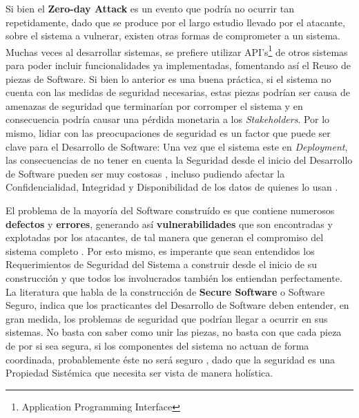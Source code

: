 Si bien el \textbf{Zero-day Attack} es un evento que podría no ocurrir tan repetidamente, dado que se produce por el largo estudio llevado por el atacante, sobre el sistema a vulnerar, existen otras formas de comprometer a un sistema. Muchas veces al desarrollar sistemas, se prefiere utilizar API's\footnote{Application Programming Interface} de otros sistemas para poder incluir funcionalidades ya implementadas, fomentando así el Reuso de piezas de Software. Si bien lo anterior es una buena práctica, si el sistema no cuenta con las medidas de seguridad necesarias, estas piezas podrían ser causa de amenazas de seguridad que terminarían por corromper el sistema y en consecuencia podría causar una pérdida monetaria a los \textit{Stakeholders}. Por lo mismo, lidiar con las preocupaciones de seguridad es un factor que puede ser clave para el Desarrollo de Software: Una vez que el sistema este en \textit{Deployment}, las consecuencias de no tener en cuenta la Seguridad desde el inicio del Desarrollo de Software pueden ser muy costosas \cite{cert}, incluso pudiendo afectar la Confidencialidad, Integridad y Disponibilidad de los datos de quienes lo usan \cite{interCoursera}. %

El problema de la mayoría del Software construído es que contiene numerosos \textbf{defectos} y \textbf{errores}, generando así \textbf{vulnerabilidades} que son encontradas y explotadas por los atacantes, de tal manera que generan el compromiso del sistema completo \cite{goertzel2007software}. Por esto mismo, es imperante que sean entendidos los Requerimientos de Seguridad del Sistema a construir desde el inicio de su construcción y que todos los involucrados también los entiendan perfectamente. La literatura que habla de la construcción de \textbf{Secure Software} o Software Seguro, indica que los practicantes del Desarrollo de Software deben entender, en gran medida, los problemas de seguridad que podrían llegar a ocurrir en sus sistemas. No basta con saber como unir las piezas, no basta con que cada pieza de por si sea segura, si los componentes del sistema no actuan de forma coordinada, probablemente éste no será seguro \cite{fernandez2013security}, dado que la seguridad es una Propiedad Sistémica que necesita ser vista de manera holística.  


